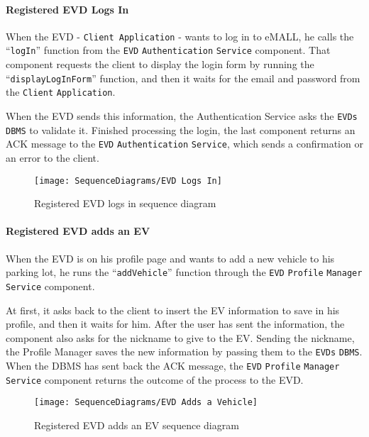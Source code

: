 \paragraph{Registered EVD Logs In}
When the EVD - \verb|Client Application| - wants to log in to eMALL, he calls the ``\verb|logIn|'' function from the \verb|EVD| \verb|Authentication| \verb|Service| component.
That component requests the client to display the login form by running the ``\verb|displayLogInForm|'' function, and then it waits for the email and password from the \verb|Client| \verb|Application|.

When the EVD sends this information, the Authentication Service asks the \verb|EVDs| \verb|DBMS| to validate it.
Finished processing the login, the last component returns an ACK message to the \verb|EVD| \verb|Authentication| \verb|Service|, which sends a confirmation or an error to the client.
\begin{figure}[H]
    \begin{center}
        \texttt{[image: SequenceDiagrams/EVD Logs In]}
        \caption{Registered EVD logs in sequence diagram}
        \label{fig:evd_logs_in}
    \end{center}
\end{figure}

\paragraph{Registered EVD adds an EV}
When the EVD is on his profile page and wants to add a new vehicle to his parking lot, he runs the ``\verb|addVehicle|'' function through the \verb|EVD| \verb|Profile| \verb|Manager| \verb|Service| component.

At first, it asks back to the client to insert the EV information to save in his profile, and then it waits for him.
After the user has sent the information, the component also asks for the nickname to give to the EV\@.
Sending the nickname, the Profile Manager saves the new information by passing them to the \verb|EVDs| \verb|DBMS|\@.
When the DBMS has sent back the ACK message, the \verb|EVD| \verb|Profile| \verb|Manager| \verb|Service| component returns the outcome of the process to the EVD\@.
\begin{figure}[H]
    \begin{center}
        \texttt{[image: SequenceDiagrams/EVD Adds a Vehicle]}
        \caption{Registered EVD adds an EV sequence diagram}
        \label{fig:evd_adds_vehicle}
    \end{center}
\end{figure}

